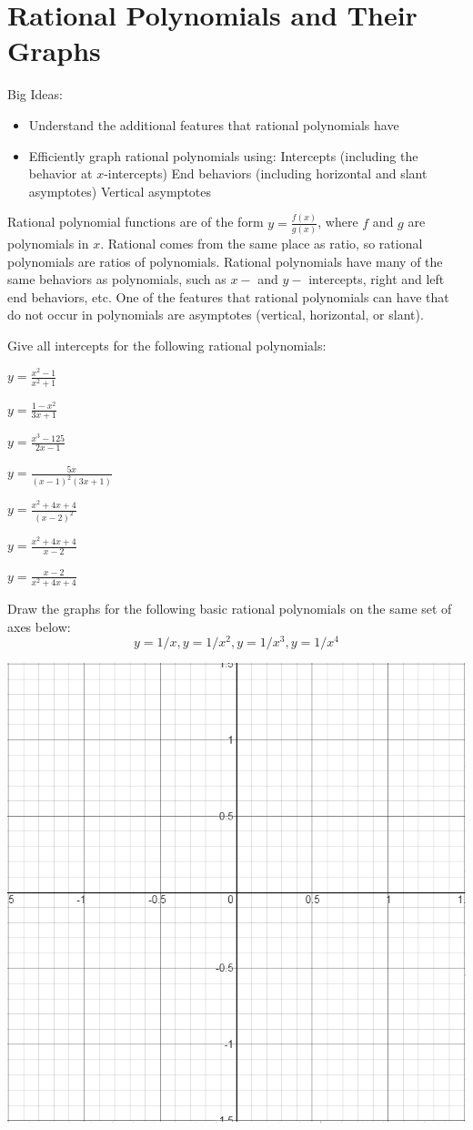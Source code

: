 \section{Rational Polynomials and Their Graphs}
Big Ideas:
\begin{itemize}
\item Understand the additional features that rational polynomials have
\item Efficiently graph rational polynomials using:
\subitem Intercepts (including the behavior at $x$-intercepts)
\subitem End behaviors (including horizontal and slant asymptotes)
\subitem Vertical asymptotes
\end{itemize}
\begin{info} Rational polynomial functions are of the form $y =\frac{f(x)}{g(x)}$, where $f$ and $g$ are polynomials in $x$. Rational comes from the same place as ratio, so rational polynomials are ratios of polynomials. Rational polynomials have many of the same behaviors as polynomials, such as $x-$ and $y-$ intercepts, right and left end behaviors, etc. One of the features that rational polynomials can have that do not occur in polynomials are asymptotes (vertical, horizontal, or slant).\end{info}
\bq Give all intercepts for the following rational polynomials:
\be
\item $y=\frac{x^2-1}{x^2+1}$
\item $y=\frac{1-x^2}{3x+1}$
\item $y=\frac{x^3-125}{2x-1}$
\item $y=\frac{5x}{(x-1)^2(3x+1)}$
\item $y=\frac{x^2+4x+4}{(x-2)^2}$
\item $y=\frac{x^2+4x+4}{x-2}$
\item $y=\frac{x-2}{x^2+4x+4}$
\ee
\eq

\bq Draw the graphs for the following basic rational polynomials on the same set of axes below:
$$ y=1/x, y=1/x^2, y=1/x^3, y=1/x^4$$

\includegraphics[scale=.5]{unitaxes.png}

